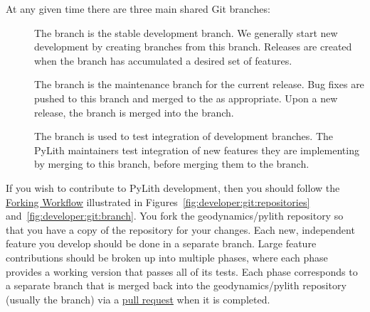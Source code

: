 At any given time there are three main shared Git branches:
\begin{description}
\item[] The  branch is the
  stable development branch. We generally start new development by
  creating branches from this branch. Releases are created when the
   branch has accumulated a desired set of features.
\item[] The  branch is the
  maintenance branch for the current release. Bug fixes are pushed
  to this branch and merged to the  as
  appropriate. Upon a new release, the  branch is
  merged into the  branch.
\item[] The  branch is used to test
  integration of development branches. The PyLith maintainers test
  integration of new features they are implementing by merging to
  this branch, before merging them to the 
  branch.
\end{description}

If you wish to contribute to PyLith development, then you should
follow the
\href{https://www.atlassian.com/git/tutorials/comparing-workflows/forking-workflow}{Forking
  Workflow} illustrated in
Figures~\vref{fig:developer:git:repositories}
and~\vref{fig:developer:git:branch}. You fork the geodynamics/pylith
repository so that you have a copy of the repository for your
changes. Each new, independent feature you develop should be done in a
separate branch. Large feature contributions should be broken up into
multiple phases, where each phase provides a working version that
passes all of its tests. Each phase corresponds to a separate branch
that is merged back into the geodynamics/pylith repository (usually
the  branch) via a
\href{https://help.github.com/articles/about-pull-requests/}{pull
  request} when it is completed.


